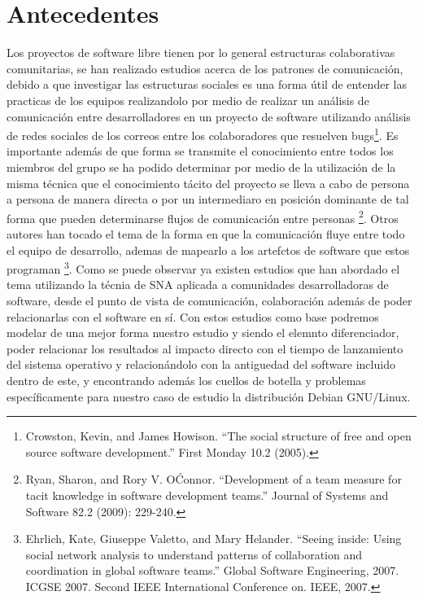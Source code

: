 \documentclass[12pt]{report}
\begin{document}
\chapter*{Antecedentes} Los proyectos de  software libre tienen por lo
general  estructuras  colaborativas  comunitarias,  se  han  realizado
estudios  acerca  de  los  patrones  de  comunicación,  debido  a  que
investigar las estructuras sociales es  una forma útil de entender las
practicas  de  los  equipos  realizandolo por  medio  de  realizar  un
análisis  de  comunicación entre  desarrolladores  en  un proyecto  de
software utilizando  análisis de redes  sociales de los  correos entre
los  colaboradores que  resuelven  bugs\footnote{Crowston, Kevin,  and
  James  Howison.  ``The  social  structure of  free  and open  source
  software development.''  First Monday  10.2 (2005).}.  Es importante
además  de que  forma se  transmite  el conocimiento  entre todos  los
miembros del grupo se ha podido determinar por medio de la utilización
de la misma técnica que el conocimiento tácito del proyecto se lleva a
cabo de persona  a persona de manera directa o  por un intermediaro en
posición  dominante de  tal forma  que pueden  determinarse flujos  de
comunicación   entre  personas   \footnote{Ryan,   Sharon,  and   Rory
  V. O\'Connor. ``Development of a team measure for tacit knowledge in
  software development teams.''  Journal  of Systems and Software 82.2
  (2009): 229-240.}.  Otros autores han tocado  el tema de la forma en
que la comunicación  fluye entre todo el equipo  de desarrollo, ademas
de  mapearlo  a   los  artefctos  de  software   que  estos  programan
\footnote{Ehrlich,   Kate,  Giuseppe   Valetto,  and   Mary  Helander.
  ``Seeing  inside:  Using  social   network  analysis  to  understand
  patterns  of  collaboration  and  coordination  in  global  software
  teams.''  Global  Software Engineering,  2007.  ICGSE  2007.  Second
  IEEE  International  Conference on.  IEEE,  2007.}.   Como se  puede
observar ya  existen estudios que  han abordado el tema  utilizando la
técnia  de SNA  aplicada  a comunidades  desarrolladoras de  software,
desde el punto de vista  de comunicación, colaboración además de poder
relacionarlas  con el  software en  sí. Con  estos estudios  como base
podremos  modelar de  una  mejor  forma nuestro  estudio  y siendo  el
elemnto  diferenciador, poder  relacionar  los  resultados al  impacto
directo  con  el  tiempo  de   lanzamiento  del  sistema  operativo  y
relacionándolo con la antiguedad del software incluido dentro de este,
y   encontrando   además   los   cuellos  de   botella   y   problemas
específicamente para  nuestro caso  de estudio la  distribución Debian
GNU/Linux.
\end{document}

